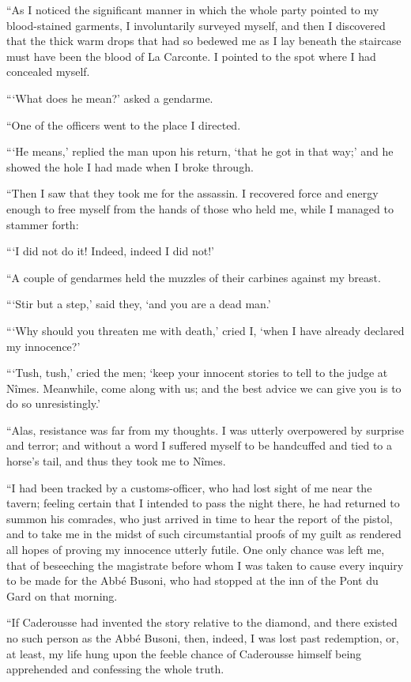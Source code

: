 “As I noticed the significant manner in which the whole party pointed
to my blood-stained garments, I involuntarily surveyed myself, and then
I discovered that the thick warm drops that had so bedewed me as I lay
beneath the staircase must have been the blood of La Carconte. I
pointed to the spot where I had concealed myself.

“‘What does he mean?’ asked a gendarme.

“One of the officers went to the place I directed.

“‘He means,’ replied the man upon his return, ‘that he got in that
way;’ and he showed the hole I had made when I broke through.

“Then I saw that they took me for the assassin. I recovered force and
energy enough to free myself from the hands of those who held me, while
I managed to stammer forth:

“‘I did not do it! Indeed, indeed I did not!’

“A couple of gendarmes held the muzzles of their carbines against my
breast.

“‘Stir but a step,’ said they, ‘and you are a dead man.’

“‘Why should you threaten me with death,’ cried I, ‘when I have already
declared my innocence?’

“‘Tush, tush,’ cried the men; ‘keep your innocent stories to tell to
the judge at Nîmes. Meanwhile, come along with us; and the best advice
we can give you is to do so unresistingly.’

“Alas, resistance was far from my thoughts. I was utterly overpowered
by surprise and terror; and without a word I suffered myself to be
handcuffed and tied to a horse’s tail, and thus they took me to Nîmes.

“I had been tracked by a customs-officer, who had lost sight of me near
the tavern; feeling certain that I intended to pass the night there, he
had returned to summon his comrades, who just arrived in time to hear
the report of the pistol, and to take me in the midst of such
circumstantial proofs of my guilt as rendered all hopes of proving my
innocence utterly futile. One only chance was left me, that of
beseeching the magistrate before whom I was taken to cause every
inquiry to be made for the Abbé Busoni, who had stopped at the inn of
the Pont du Gard on that morning.

“If Caderousse had invented the story relative to the diamond, and
there existed no such person as the Abbé Busoni, then, indeed, I was
lost past redemption, or, at least, my life hung upon the feeble chance
of Caderousse himself being apprehended and confessing the whole truth.

